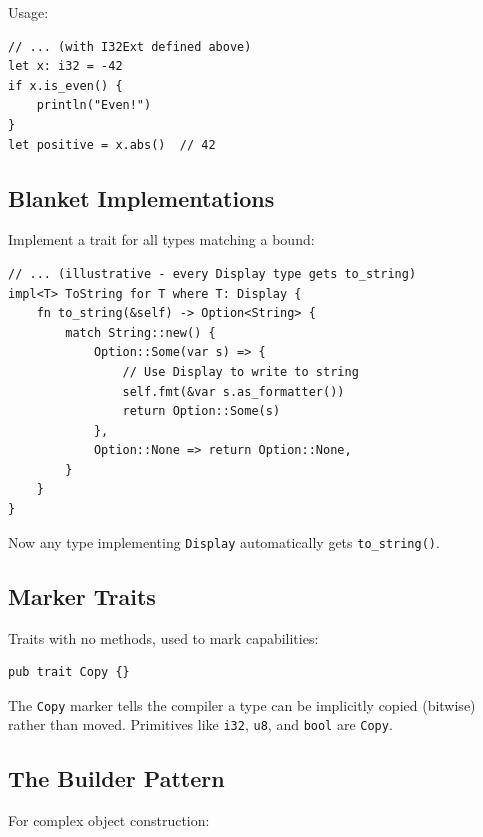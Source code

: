 Usage:

\begin{lstlisting}
// ... (with I32Ext defined above)
let x: i32 = -42
if x.is_even() {
    println("Even!")
}
let positive = x.abs()  // 42
\end{lstlisting}

\subsection{Blanket Implementations}

Implement a trait for all types matching a bound:

\begin{lstlisting}
// ... (illustrative - every Display type gets to_string)
impl<T> ToString for T where T: Display {
    fn to_string(&self) -> Option<String> {
        match String::new() {
            Option::Some(var s) => {
                // Use Display to write to string
                self.fmt(&var s.as_formatter())
                return Option::Some(s)
            },
            Option::None => return Option::None,
        }
    }
}
\end{lstlisting}

Now any type implementing \texttt{Display} automatically gets \texttt{to\_string()}.

\subsection{Marker Traits}

Traits with no methods, used to mark capabilities:

\begin{lstlisting}
pub trait Copy {}
\end{lstlisting}

The \texttt{Copy} marker tells the compiler a type can be implicitly copied (bitwise) rather than moved. Primitives like \texttt{i32}, \texttt{u8}, and \texttt{bool} are \texttt{Copy}.

\subsection{The Builder Pattern}

For complex object construction:

